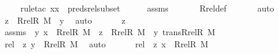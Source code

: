 \begin{isabellebody}
\ \ \ \ \isamarkupfalse%
{\isacharparenleft}{\kern0pt}rule{\isacharunderscore}{\kern0pt}tac\ x{\isacharequal}{\kern0pt}x\ \ preds{\isacharunderscore}{\kern0pt}rel{\isacharunderscore}{\kern0pt}subset{\isacharprime}{\kern0pt}{\isacharparenright}{\kern0pt}\isanewline
\ \ \ \ \isamarkupfalse%
\ assms\ \isanewline
\ \ \ \ \isamarkupfalse%
\ Rrel{\isacharunderscore}{\kern0pt}def\ \isanewline
\ \ \ \ \isamarkupfalse%
\ auto\isanewline
\ \ \isamarkupfalse%
\ \isamarkupfalse%
\ {\isachardoublequoteopen}z\ {\isasymin}\ Rrel{\isacharparenleft}{\kern0pt}R{\isacharcomma}{\kern0pt}\ M{\isacharparenright}{\kern0pt}\ {\isacharminus}{\kern0pt}{\isacharbackquote}{\kern0pt}{\isacharbackquote}{\kern0pt}\ {\isacharbraceleft}{\kern0pt}y{\isacharbraceright}{\kern0pt}{\isachardoublequoteclose}\ \isamarkupfalse%
\ auto\ \isanewline
{}\isamarkupfalse%
\ \isanewline
\ \ \isamarkupfalse%
\ z\ \isamarkupfalse%
\ assms\ {\isacharcolon}{\kern0pt}\ {\isachardoublequoteopen}{\isacharless}{\kern0pt}y{\isacharcomma}{\kern0pt}\ x{\isachargreater}{\kern0pt}\ {\isasymin}\ Rrel{\isacharparenleft}{\kern0pt}R{\isacharcomma}{\kern0pt}\ M{\isacharparenright}{\kern0pt}{\isachardoublequoteclose}\ \ {\isachardoublequoteopen}z\ {\isasymin}\ Rrel{\isacharparenleft}{\kern0pt}R{\isacharcomma}{\kern0pt}\ M{\isacharparenright}{\kern0pt}\ {\isacharminus}{\kern0pt}{\isacharbackquote}{\kern0pt}{\isacharbackquote}{\kern0pt}\ {\isacharbraceleft}{\kern0pt}y{\isacharbraceright}{\kern0pt}{\isachardoublequoteclose}\ {\isachardoublequoteopen}trans{\isacharparenleft}{\kern0pt}Rrel{\isacharparenleft}{\kern0pt}R{\isacharcomma}{\kern0pt}\ M{\isacharparenright}{\kern0pt}{\isacharparenright}{\kern0pt}{\isachardoublequoteclose}\ \isanewline
\ \ \isamarkupfalse%
\ \isamarkupfalse%
\ rel\ {\isacharcolon}{\kern0pt}\ {\isachardoublequoteopen}{\isacharless}{\kern0pt}z{\isacharcomma}{\kern0pt}\ y{\isachargreater}{\kern0pt}\ {\isasymin}\ Rrel{\isacharparenleft}{\kern0pt}R{\isacharcomma}{\kern0pt}\ M{\isacharparenright}{\kern0pt}{\isachardoublequoteclose}\ \isamarkupfalse%
\ auto\ \isanewline
\ \ \isamarkupfalse%
\ \isamarkupfalse%
\ rel{\isacharprime}{\kern0pt}\ {\isacharcolon}{\kern0pt}\ {\isachardoublequoteopen}{\isacharless}{\kern0pt}z{\isacharcomma}{\kern0pt}\ x{\isachargreater}{\kern0pt}\ {\isasymin}\ Rrel{\isacharparenleft}{\kern0pt}R{\isacharcomma}{\kern0pt}\ M{\isacharparenright}{\kern0pt}{\isachardoublequoteclose}\ \isamarkupfalse%

\end{isabellebody}
